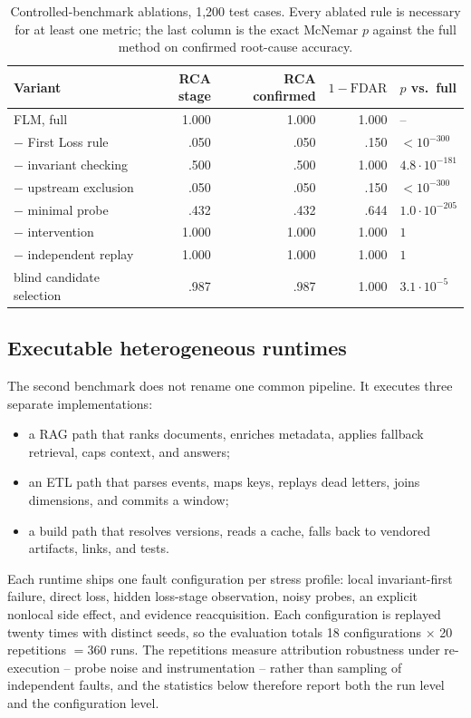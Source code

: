 \documentclass[10pt]{article}
\newcommand{\NA}{--}
\begin{document}
\begin{table}[t]
\centering
\caption{Controlled-benchmark ablations, 1,200 test cases. Every ablated rule is necessary for at least one metric; the last column is the exact McNemar $p$ against the full method on confirmed root-cause accuracy.}
\label{tab:ablation}
\begin{tabular}{lrrrl}
\toprule
Variant & RCA stage & RCA confirmed & $1-\mathrm{FDAR}$ & $p$ vs.\ full \\
\midrule
FLM, full & 1.000 & 1.000 & 1.000 & \NA \\
\quad $-$ First Loss rule & .050 & .050 & .150 & $<10^{-300}$ \\
\quad $-$ invariant checking & .500 & .500 & 1.000 & $4.8\cdot10^{-181}$ \\
\quad $-$ upstream exclusion & .050 & .050 & .150 & $<10^{-300}$ \\
\quad $-$ minimal probe & .432 & .432 & .644 & $1.0\cdot10^{-205}$ \\
\quad $-$ intervention & 1.000 & 1.000 & 1.000 & $1$ \\
\quad $-$ independent replay & 1.000 & 1.000 & 1.000 & $1$ \\
\quad blind candidate selection & .987 & .987 & 1.000 & $3.1\cdot10^{-5}$ \\
\bottomrule
\end{tabular}
\end{table}

\subsection{Executable heterogeneous runtimes}
\label{sec:runtimes}

The second benchmark does not rename one common pipeline. It executes three separate implementations:
\begin{itemize}[leftmargin=*]
  \item a RAG path that ranks documents, enriches metadata, applies fallback retrieval, caps context, and answers;
  \item an ETL path that parses events, maps keys, replays dead letters, joins dimensions, and commits a window;
  \item a build path that resolves versions, reads a cache, falls back to vendored artifacts, links, and tests.
\end{itemize}
Each runtime ships one fault configuration per stress profile: local invariant-first failure, direct loss, hidden loss-stage observation, noisy probes, an explicit nonlocal side effect, and evidence reacquisition. Each configuration is replayed twenty times with distinct seeds, so the evaluation totals 18 configurations $\times$ 20 repetitions $=360$ runs. The repetitions measure attribution robustness under re-execution -- probe noise and instrumentation -- rather than sampling of independent faults, and the statistics below therefore report both the run level and the configuration level.
\end{document}
